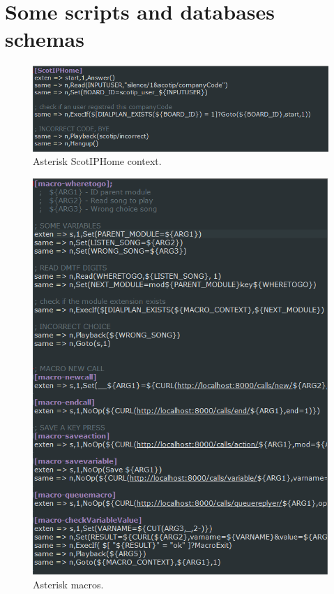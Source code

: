 \section{Some scripts and databases schemas}

\begin{figure}[!ht]
  \caption{Asterisk ScotIPHome context.}
  \centering
    \includegraphics[width=1\textwidth]{img/ScotIPHome.png}
\end{figure}


\begin{figure}[!ht]
  \caption{Asterisk macros.}
  \centering
    \includegraphics[width=1\textwidth]{img/asteriskMacros.png}
\end{figure}

